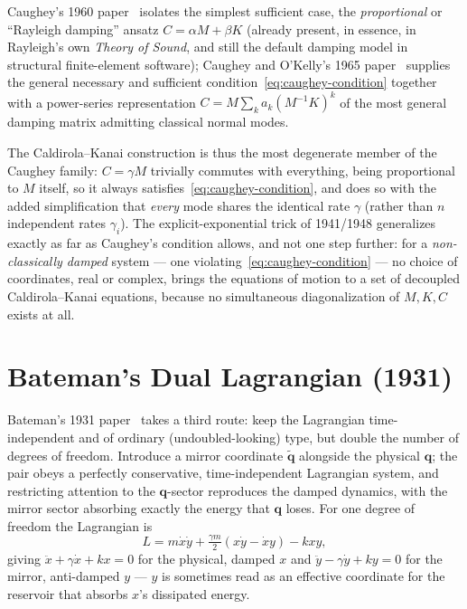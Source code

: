 \documentclass[12pt]{book}
\theoremstyle{definition}
\theoremstyle{remark}
\newcommand{\vq}{\mathbf{q}}
\newcommand{\qt}{\tilde{\vq}}
\newcommand{\Mm}{M}
\newcommand{\Kk}{K}
\newcommand{\Cc}{C}
\begin{document}
Caughey's 1960 paper~\cite{Caughey1960} isolates the simplest sufficient case, the \emph{proportional} or ``Rayleigh damping'' ansatz $\Cc = \alpha\Mm+\beta\Kk$ (already present, in essence, in Rayleigh's own \emph{Theory of Sound}, and still the default damping model in structural finite-element software); Caughey and O'Kelly's 1965 paper~\cite{CaugheyOKelly1965} supplies the general necessary and sufficient condition~\eqref{eq:caughey-condition} together with a power-series representation $\Cc = \Mm\sum_{k} a_k(\Mm^{-1}\Kk)^k$ of the most general damping matrix admitting classical normal modes.

The Caldirola--Kanai construction is thus the most degenerate member of the Caughey family: $\Cc=\gamma\Mm$ trivially commutes with everything, being proportional to $\Mm$ itself, so it always satisfies~\eqref{eq:caughey-condition}, and does so with the added simplification that \emph{every} mode shares the identical rate $\gamma$ (rather than $n$ independent rates $\gamma_i$). The explicit-exponential trick of 1941/1948 generalizes exactly as far as Caughey's condition allows, and not one step further: for a \emph{non-classically damped} system --- one violating~\eqref{eq:caughey-condition} --- no choice of coordinates, real or complex, brings the equations of motion to a set of decoupled Caldirola--Kanai equations, because no simultaneous diagonalization of $\Mm,\Kk,\Cc$ exists at all.

\section{Bateman's Dual Lagrangian (1931)}
\label{sec:bateman}

Bateman's 1931 paper~\cite{Bateman1931} takes a third route: keep the Lagrangian time-independent and of ordinary (undoubled-looking) type, but double the number of degrees of freedom. Introduce a mirror coordinate $\qt$ alongside the physical $\vq$; the pair obeys a perfectly conservative, time-independent Lagrangian system, and restricting attention to the $\vq$-sector reproduces the damped dynamics, with the mirror sector absorbing exactly the energy that $\vq$ loses. For one degree of freedom the Lagrangian is
\[
L = m\dot x\dot y + \tfrac{\gamma m}{2}(x\dot y - \dot x y) - kxy ,
\]
giving $\ddot x+\gamma\dot x+kx=0$ for the physical, damped $x$ and $\ddot y - \gamma\dot y + ky = 0$ for the mirror, anti-damped $y$ --- $y$ is sometimes read as an effective coordinate for the reservoir that absorbs $x$'s dissipated energy.
\end{document}
